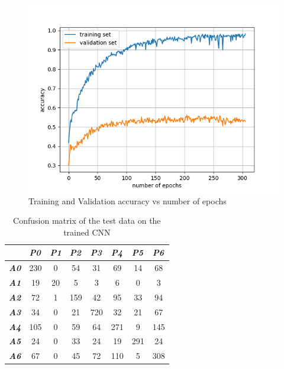 \documentclass[12pt,twoside]{article}
\begin{document}
\begin{figure}[!htbp]
\centering %
\includegraphics[width = 0.8\hsize]{./figures/cnn_training.png} %
\caption{Training and Validation accuracy vs number of epochs} %
\label{cnn01}
\end{figure}

\begin{table}[!htbp]
\centering
\begin{tabular}{|l|c|c|c|c|c|c|c|}
\hline
& \multicolumn{1}{l|}{\textit{\textbf{P0}}} & \multicolumn{1}{l|}{\textit{\textbf{P1}}} & \multicolumn{1}{l|}{\textit{\textbf{P2}}} & \multicolumn{1}{l|}{\textit{\textbf{P3}}} & \multicolumn{1}{l|}{\textit{\textbf{P4}}} & \multicolumn{1}{l|}{\textit{\textbf{P5}}} & \multicolumn{1}{l|}{\textit{\textbf{P6}}} \\ \hline
\textit{\textbf{A0}} & 230&   0&  54&  31&  69&  14&  68 \\ \hline
\textit{\textbf{A1}} &  19&  20&   5&   3&   6&   0&   3 \\ \hline
\textit{\textbf{A2}} & 72&   1& 159&  42&  95&  33&  94 \\ \hline
\textit{\textbf{A3}} & 34&   0&  21& 720&  32&  21&  67 \\ \hline
\textit{\textbf{A4}} & 105&   0&  59&  64& 271&   9& 145 \\ \hline
\textit{\textbf{A5}} & 24&   0&  33&  24&  19& 291&  24  \\ \hline
\textit{\textbf{A6}} & 67&   0&  45&  72& 110&   5& 308 \\ \hline
\end{tabular}
\caption{Confusion matrix of the test data on the trained CNN}
\label{confusion02}
\end{table}
\end{document}

